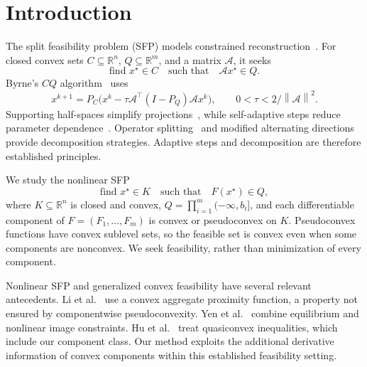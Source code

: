 \documentclass[]{interact}
\theoremstyle{plain}
\theoremstyle{definition}
\theoremstyle{remark}
\newcommand{\R}{\mathbb{R}}
\newcommand{\norm}[1]{\left\lVert #1 \right\rVert}
\begin{document}
\section{Introduction}\label{sec:intro}

The split feasibility problem (SFP) models constrained reconstruction~\citep{censor1994}. For closed convex sets $C\subseteq\R^n$, $Q\subseteq\R^m$, and a matrix $\mathcal A$, it seeks
\begin{equation}\label{eq:sfp-intro}
\text{find }x^\star\in C\quad\text{such that}\quad\mathcal A x^\star\in Q.
\end{equation}
Byrne's $CQ$ algorithm~\citep{byrne2002} uses
\begin{equation}\label{eq:cq-intro}
x^{k+1}=P_C\bigl(x^k-\tau\mathcal A^\top(I-P_Q)\mathcal A x^k\bigr),
\qquad 0<\tau<2/\norm{\mathcal A}^2.
\end{equation}
Supporting half-spaces simplify projections~\citep{yang2004}, while self-adaptive steps reduce parameter dependence~\citep{zhang2009adaptive,zhao2011adaptive,lopez2012}. Operator splitting~\citep{zhang2012simultaneous} and modified alternating directions~\citep{yang2014alternating} provide decomposition strategies. Adaptive steps and decomposition are therefore established principles.

We study the nonlinear SFP
\begin{equation}\label{eq:nsfp-intro}
\text{find }x^\star\in K\quad\text{such that}\quad F(x^\star)\in Q,
\end{equation}
where $K\subseteq\R^n$ is closed and convex, $Q=\prod_{i=1}^m(-\infty,b_i]$, and each differentiable component of $F=(F_1,\ldots,F_m)$ is convex or pseudoconvex on $K$. Pseudoconvex functions have convex sublevel sets, so the feasible set is convex even when some components are nonconvex. We seek feasibility, rather than minimization of every component.

Nonlinear SFP and generalized convex feasibility have several relevant antecedents. Li et al.~\citep{li2013nsfp} use a convex aggregate proximity function, a property not ensured by componentwise pseudoconvexity. Yen et al.~\citep{yen2019} combine equilibrium and nonlinear image constraints. Hu et al.~\citep{hu2022quasi} treat quasiconvex inequalities, which include our component class. Our method exploits the additional derivative information of convex components within this established feasibility setting.
\end{document}
